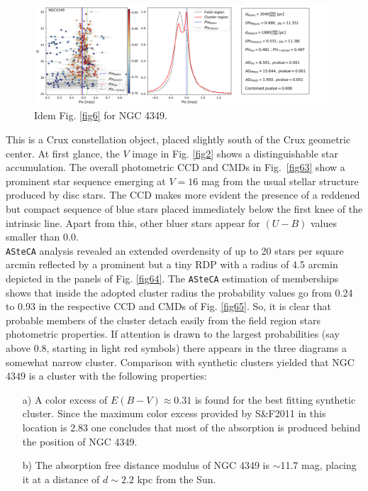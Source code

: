 \documentclass[draft]{aa}
\begin{document}
\begin{figure}[ht]
    \centering
    \includegraphics[width=\hsize]{../figs/plx_NGC4349.png}
    \caption{Idem Fig. \ref{fig6} for NGC 4349.}
    \label{fig66}
\end{figure}


This is a Crux constellation object, placed slightly south of the Crux geometric
center. At first glance, the $V$ image in Fig. \ref{fig2} shows a
distinguishable star accumulation. The overall photometric CCD and CMDs in
Fig.~\ref{fig63} show a prominent star sequence emerging at $V=16$ mag from the
usual stellar structure produced by disc stars. The CCD makes more evident the
presence of a reddened but compact sequence of blue stars placed immediately
below the first knee of the intrinsic line. Apart from this, other bluer stars
appear for $(U-B)$ values smaller than 0.0.\\ 

\texttt{ASteCA} analysis revealed an extended overdensity of up to 20 stars per
square arcmin reflected by a prominent but a tiny RDP with a radius of 4.5
arcmin depicted in the panels of Fig. \ref{fig64}.
The \texttt{ASteCA} estimation of memberships shows that inside the adopted
cluster radius the probability values go from 0.24 to 0.93 in the respective
CCD and CMDs of Fig. \ref{fig65}. So, it is clear that probable members of the
cluster detach easily from the field region stars photometric properties. If
attention is drawn to the largest probabilities (say above 0.8, starting in
light red symbols) there appears in the three diagrams a somewhat narrow
cluster. Comparison with synthetic clusters yielded that NGC 4349 is a cluster
with the following properties:

\begin{itemize}
    \item [a)] A color excess of $E(B-V)\approx0.31$ is found for the best
    fitting synthetic cluster. Since the maximum color excess provided by
    S\&F2011 in this location is 2.83 one concludes that most of the
    absorption is produced behind the position of NGC 4349.
    \item [b)] The absorption free distance modulus of NGC 4349 is $\sim$11.7
    mag, placing it at a distance of $d\sim2.2$ kpc from the Sun. 
\end{itemize}
\end{document}
